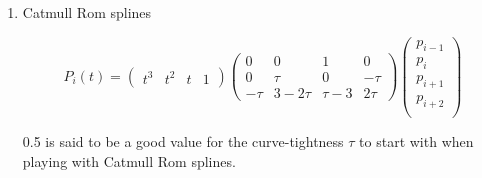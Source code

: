 \documentclass{article}
\begin{document}
\begin{enumerate}
\item Catmull Rom splines

\[
	P_i(t) = 
	\left(
		\begin{array}{cccc}
			t^3 & t^2 & t & 1
		\end{array}
	\right)
	\left(
		\begin{array}{cccc}
			0 & 0 & 1 & 0 \\
			0 & \tau & 0 & -\tau \\
			-\tau & 3 - 2\tau & \tau - 3 & 2\tau
		\end{array}
	\right)
	\left(
		\begin{array}{c}
			p_{i-1}  \\
			p_{i}     \\
			p_{i+1} \\
			p_{i+2} \\
		\end{array}
	\right)
\]

0.5 is said to be a good value for the curve-tightness $\tau$ to start with when playing with Catmull Rom splines.

\end{enumerate}
\end{document}
